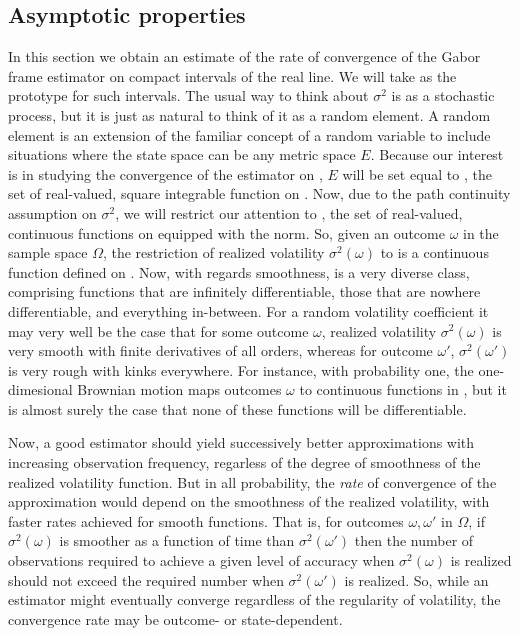 \subsection{Asymptotic properties} \label{sec:deviation}
In this section we obtain an estimate of the rate of convergence of  the Gabor frame estimator on compact intervals of the real line. We will take \domain as the prototype for such intervals. The usual way to think about  $\sigma^2$ is as a stochastic process, but it is just as natural to think of it as a random element. A random element is an extension  of the familiar concept of a random variable to include  situations where the state space can be any metric space $E$. Because our interest is in studying the convergence of the estimator on \domain,  $E$ will be set equal to \Ltwo, the set of real-valued, square integrable function on \domain. Now, due to the path continuity assumption on $\sigma^2$, we will restrict our attention to \czero,  the set of real-valued, continuous  functions on \domain equipped with the \Ltwo norm. So, given  an outcome $\omega$ in the sample space  $\Omega$, the restriction of realized volatility $\sigma^2(\omega)$ to \domain is a  continuous function defined on \domain. Now, with regards smoothness, \state  is  a very diverse class, comprising    functions that are infinitely differentiable,  those that are nowhere differentiable, and everything in-between. For a random volatility coefficient it may very well be the case that for some outcome $\omega$, realized volatility $\sigma^2(\omega)$ is very smooth with finite derivatives of all orders, whereas for outcome $\omega'$,  $\sigma^2(\omega')$  is very rough with kinks everywhere. For instance, with probability one, the one-dimesional Brownian motion  maps outcomes $\omega$  to continuous functions in  \state, but it is  almost surely  the case that none of these functions will be  differentiable. 

Now,  a good estimator should  yield successively better approximations with increasing observation frequency, regarless of the degree of smoothness  of the realized volatility function. But in all probability, the \emph{rate} of convergence of the approximation would depend on the smoothness of the realized volatility, with faster rates achieved for smooth functions. That is, for outcomes $\omega, \omega'$ in $\Omega$, if $\sigma^2(\omega)$ is  smoother as a function of time than $\sigma^2(\omega')$ then the number of observations required to achieve a given level of accuracy when $\sigma^2(\omega)$ is realized should not exceed  the required number when $\sigma^2(\omega')$ is realized.  So, while an estimator might eventually converge regardless of the regularity of volatility, the convergence rate may be outcome- or state-dependent. 


